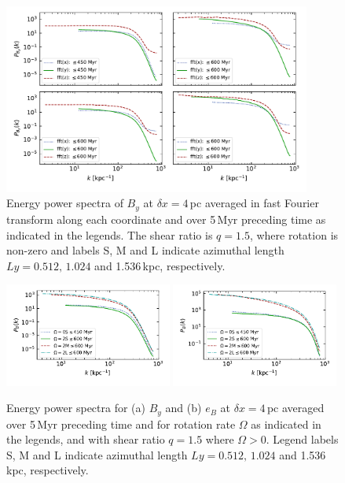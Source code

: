 \documentclass[iop,apj,numberedappendix,twocolappendix]{emulateapj}
\newcommand{\dx}{\delta x}
\begin{document}
\begin{figure}
\centering
\includegraphics[trim=0.0cm 0.0cm 0.0cm 0.0cm,clip=true,width=0.9\textwidth]{csc_figs/B2O1_5qL4power.pdf}
\caption{
Energy power spectra of $B_y$ at $\dx=4$\,pc averaged in fast Fourier transform
along each coordinate and over 5\,Myr preceding time as indicated in the
legends. 
The shear ratio is $q=1.5$, where rotation is non-zero and labels S, M and L
indicate azimuthal length $Ly=0.512,\,1.024$ and 
1.536\,kpc, respectively.
\label{fig:4power}
}
\end{figure}

\begin{figure}
\centering
\includegraphics[trim=0.0cm 0.0cm 0.0cm 0.0cm,clip=true,width=0.49\textwidth]{csc_figs/B2O1_5qLBpowery.pdf}
\includegraphics[trim=0.0cm 0.0cm 0.0cm 0.0cm,clip=true,width=0.49\textwidth]{csc_figs/B2O1_5qLB2powery.pdf}
\caption{
Energy power spectra for (a) $B_y$ and (b) $e_B$ at $\dx=4$\,pc averaged
over 5\,Myr preceding time and for rotation rate $\Omega$ as indicated in the
legends, and with shear ratio $q=1.5$ where $\Omega>0$.
Legend labels S, M and L indicate azimuthal length $Ly=0.512,\,1.024$ and 
1.536\,kpc, respectively. 
\label{fig:Bypower}
}
\end{figure}
\end{document}
